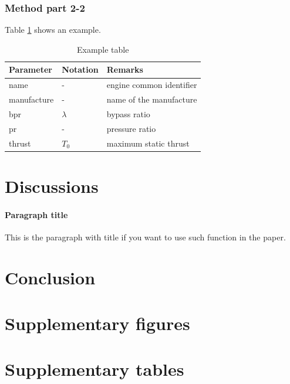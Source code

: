 \documentclass[
  manuscript=article,  %
  layout=preprint,  %
  year=20xx,
  volume=x,
]{extra/joas}
\begin{document}
\subsubsection{Method part 2-2}

\blindtext Table \ref{tb:example_table} shows an example.

\begin{table}[H]
  \centering
  \small
  \caption{Example table}
  \label{tb:example_table}
  \begin{tabular}{lll}
  \toprule
  \textbf{Parameter} & \textbf{Notation} & \textbf{Remarks} \\
  \midrule
  name & - & engine common identifier \\
  manufacture & - & name of the manufacture  \\
  bpr & $\lambda$ & bypass ratio \\
  pr & - & pressure ratio \\
  thrust & $T_0$ & maximum static thrust\\
  \bottomrule
  \end{tabular}
\end{table}

\blindtext


\section{Discussions}

\paragraph{Paragraph title} This is the paragraph with title if you want to use such function in the paper. \blindtext


\section{Conclusion}

\blindtext


\appendix

\section{Supplementary figures}
\blindtext

\section{Supplementary tables}
\blindtext
\end{document}
